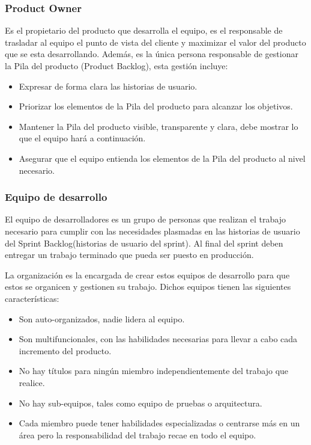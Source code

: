 \subsubsection{Product Owner}

Es el propietario del producto que desarrolla el equipo, es el responsable de trasladar al equipo el punto de vista del cliente y maximizar
el valor del producto que se esta desarrollando. Además, es la única persona responsable de gestionar la Pila del producto (Product Backlog), 
esta gestión incluye:

\begin{itemize}
	\item Expresar de forma clara las historias de usuario.
	\item Priorizar los elementos de la Pila del producto para alcanzar los objetivos.
	\item Mantener la Pila del producto visible, transparente y clara, debe mostrar lo que el equipo hará a continuación.
	\item Asegurar que el equipo entienda los elementos de la Pila del producto al nivel necesario.
\end{itemize}

\subsubsection{Equipo de desarrollo}

El equipo de desarrolladores es un grupo de personas que realizan el trabajo necesario para cumplir con las
necesidades plasmadas en las historias de usuario del Sprint Backlog(historias de usuario del sprint). Al final 
del sprint deben entregar un trabajo terminado que pueda ser puesto en producción.

La organización es la encargada de crear estos equipos de desarrollo para que estos se organicen y gestionen 
su trabajo. Dichos equipos tienen las siguientes características:

\begin{itemize}
	\item Son auto-organizados, nadie lidera al equipo.
	\item Son multifuncionales, con las habilidades necesarias para llevar a cabo cada incremento del producto.
	\item No hay títulos para ningún miembro independientemente del trabajo que realice.
	\item No hay sub-equipos, tales como equipo de pruebas o arquitectura.
	\item Cada miembro puede tener habilidades especializadas o centrarse más en un área pero la responsabilidad
	del trabajo recae en todo el equipo.
\end{itemize}

